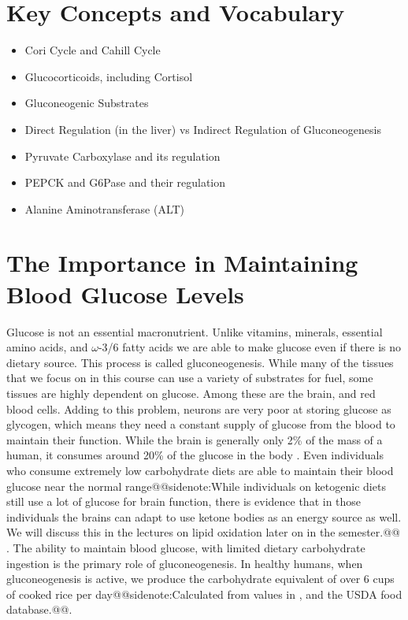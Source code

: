 \documentclass{tufte-handout}
\makeatletter
\def\sidenote#1{@@sidenote:#1@@}
\makeatother
\begin{document}
\section{Key Concepts and Vocabulary}

\begin{itemize}
	\item Cori Cycle and Cahill Cycle
	\item Glucocorticoids, including Cortisol
	\item Gluconeogenic Substrates
	\item Direct Regulation (in the liver) vs Indirect Regulation of Gluconeogenesis
	\item Pyruvate Carboxylase and its regulation
	\item PEPCK and G6Pase and their regulation
	\item Alanine Aminotransferase (ALT)
\end{itemize}

\section{The Importance in Maintaining Blood Glucose Levels}

Glucose is not an essential macronutrient.  Unlike vitamins, minerals, essential amino acids, and $\omega$-3/6 fatty acids we are able to make glucose even if there is no dietary source.  This process is called gluconeogenesis.  While many of the tissues that we focus on in this course can use a variety of substrates for fuel, some tissues are highly dependent on glucose.  Among these are the brain, and red blood cells.  Adding to this problem, neurons are very poor at storing glucose as glycogen, which means they need a constant supply of glucose from the blood to maintain their function.  While the brain is generally only 2\% of the mass of a human, it consumes around 20\% of the glucose in the body \citep{Erbsloh1958}.  Even individuals who consume extremely low carbohydrate diets are able to maintain their blood glucose near the normal range\sidenote{While individuals on ketogenic diets still use a lot of glucose for brain function, there is evidence that in those individuals the brains can adapt to use ketone bodies as an energy source as well.  We will discuss this in the lectures on lipid oxidation later on in the semester.} \citep{Bueno2013}.  The ability to maintain blood glucose, with limited dietary carbohydrate ingestion is the primary role of gluconeogenesis.  In healthy humans, when gluconeogenesis is active, we produce the carbohydrate equivalent of over 6 cups of cooked rice per day\sidenote{Calculated from values in \citet{Rothman1991}, and the USDA food database.}.  
\end{document}
